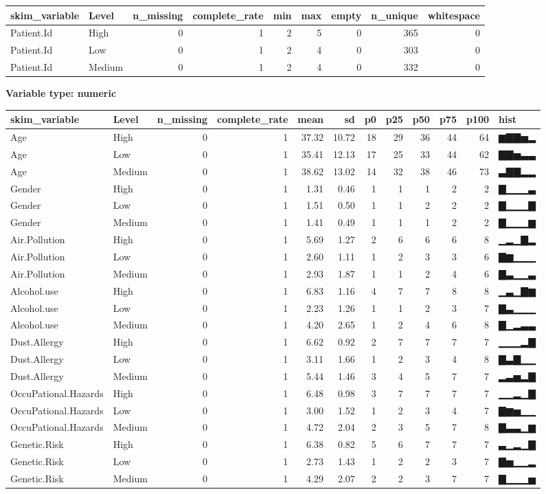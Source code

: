 \documentclass[]{article}
\begin{document}
\begin{longtable}[]{@{}llrrrrrrr@{}}
\toprule
skim\_variable & Level & n\_missing & complete\_rate & min & max & empty
& n\_unique & whitespace\tabularnewline
\midrule
\endhead
Patient.Id & High & 0 & 1 & 2 & 5 & 0 & 365 & 0\tabularnewline
Patient.Id & Low & 0 & 1 & 2 & 4 & 0 & 303 & 0\tabularnewline
Patient.Id & Medium & 0 & 1 & 2 & 4 & 0 & 332 & 0\tabularnewline
\bottomrule
\end{longtable}

\textbf{Variable type: numeric}

\begin{longtable}[]{@{}llrrrrrrrrrl@{}}
\toprule
skim\_variable & Level & n\_missing & complete\_rate & mean & sd & p0 &
p25 & p50 & p75 & p100 & hist\tabularnewline
\midrule
\endhead
Age & High & 0 & 1 & 37.32 & 10.72 & 18 & 29 & 36 & 44 & 64 &
▆▇▇▅▂\tabularnewline
Age & Low & 0 & 1 & 35.41 & 12.13 & 17 & 25 & 33 & 44 & 62 &
▇▇▅▃▃\tabularnewline
Age & Medium & 0 & 1 & 38.62 & 13.02 & 14 & 32 & 38 & 46 & 73 &
▃▇▇▂▂\tabularnewline
Gender & High & 0 & 1 & 1.31 & 0.46 & 1 & 1 & 1 & 2 & 2 &
▇▁▁▁▃\tabularnewline
Gender & Low & 0 & 1 & 1.51 & 0.50 & 1 & 1 & 2 & 2 & 2 &
▇▁▁▁▇\tabularnewline
Gender & Medium & 0 & 1 & 1.41 & 0.49 & 1 & 1 & 1 & 2 & 2 &
▇▁▁▁▆\tabularnewline
Air.Pollution & High & 0 & 1 & 5.69 & 1.27 & 2 & 6 & 6 & 6 & 8 &
▁▂▁▇▂\tabularnewline
Air.Pollution & Low & 0 & 1 & 2.60 & 1.11 & 1 & 2 & 3 & 3 & 6 &
▇▆▁▁▁\tabularnewline
Air.Pollution & Medium & 0 & 1 & 2.93 & 1.87 & 1 & 1 & 2 & 4 & 6 &
▇▃▁▁▃\tabularnewline
Alcohol.use & High & 0 & 1 & 6.83 & 1.16 & 4 & 7 & 7 & 8 & 8 &
▁▃▁▇▆\tabularnewline
Alcohol.use & Low & 0 & 1 & 2.23 & 1.26 & 1 & 1 & 2 & 3 & 7 &
▇▃▁▁▁\tabularnewline
Alcohol.use & Medium & 0 & 1 & 4.20 & 2.65 & 1 & 2 & 4 & 6 & 8 &
▇▁▂▃▃\tabularnewline
Dust.Allergy & High & 0 & 1 & 6.62 & 0.92 & 2 & 7 & 7 & 7 & 7 &
▁▁▁▂▇\tabularnewline
Dust.Allergy & Low & 0 & 1 & 3.11 & 1.66 & 1 & 2 & 3 & 4 & 8 &
▇▃▇▁▁\tabularnewline
Dust.Allergy & Medium & 0 & 1 & 5.44 & 1.46 & 3 & 4 & 5 & 7 & 7 &
▂▃▅▂▇\tabularnewline
OccuPational.Hazards & High & 0 & 1 & 6.48 & 0.98 & 3 & 7 & 7 & 7 & 7 &
▁▁▂▁▇\tabularnewline
OccuPational.Hazards & Low & 0 & 1 & 3.00 & 1.52 & 1 & 2 & 3 & 4 & 7 &
▇▆▅▁▁\tabularnewline
OccuPational.Hazards & Medium & 0 & 1 & 4.72 & 2.04 & 2 & 3 & 5 & 7 & 8
& ▇▃▃▁▆\tabularnewline
Genetic.Risk & High & 0 & 1 & 6.38 & 0.82 & 5 & 6 & 7 & 7 & 7 &
▃▁▂▁▇\tabularnewline
Genetic.Risk & Low & 0 & 1 & 2.73 & 1.43 & 1 & 2 & 2 & 3 & 7 &
▇▅▁▁▂\tabularnewline
Genetic.Risk & Medium & 0 & 1 & 4.29 & 2.07 & 2 & 2 & 3 & 7 & 7 &
▇▁▁▁▅\tabularnewline

\end{longtable}
\end{document}
